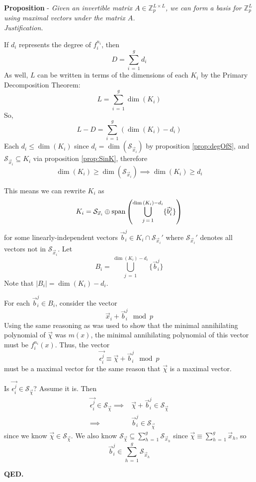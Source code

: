 \documentclass[a4paper, 12pt, reqno]{amsart}
\newcommand\vecspan[1]{\textup{span}\left( #1 \right)}
\newcounter{propcounter}
\newenvironment{proposition}[1]
{
	\refstepcounter{propcounter}
	\textbf{Proposition \thepropcounter} - \emph{#1} \\
	\emph{Justification.}
}
{
	\textbf{QED.} \\
}
\begin{document}
\begin{proposition}{Given an invertible matrix $A \in \mathds{Z}_p^{L \times L}$, we can form a basis for $\mathds{Z}_p^L$ using maximal vectors under the matrix 
		$A$.}
			If $d_i$ represents the degree of $f_i^{n_i}$, then 
			\[
				D = \sum_{i\,=\,1}^g d_i
			\]
			As well, $L$ can be written in terms of the dimensions of each $K_i$ by the Primary Decomposition Theorem:
			\[
				L = \sum_{i\,=\,1}^g \dim{(K_i)}
			\]
			So,
			\[
				L-D = \sum_{i\,=\,1}^g (\dim{(K_i)}-d_i)
			\]
			Each $d_i \leq \dim{(K_i)}$ since $d_i = \dim{(\mathcal{S}_{\vec{x}_i})}$ by proposition \ref{prop:degOfS}, and $\mathcal{S}_{\vec{x}_i} \subseteq K_i$ via 
			proposition \ref{prop:SinK}, therefore
			\[
				\dim{(K_i)} \geq \dim{(\mathcal{S}_{\vec{x}_i})} \implies \dim{(K_i)} \geq d_i
			\]
			
			This means we can rewrite $K_i$ as
			\[
				K_i = \mathcal{S}_{\vec{x}_i} \oplus \vecspan{\bigcup_{j\,=\,1}^{\dim{(K_i)}-d_i} \{\vec{b}_i^j\}}
			\]
			for some linearly-independent vectors $\vec{b}_i^j \in K_i \cap \mathcal{S}_{\vec{x}_i}'$ where $\mathcal{S}_{\vec{x}_i}'$ denotes all vectors not in 
			$\mathcal{S}_{\vec{x}_i}$. Let 
			\[
				B_i = \bigcup_{j\,=\,1}^{\dim{(K_i)}-d_i} \{\vec{b}_i^j\}
			\]
			Note that $|B_i| = \dim{(K_i)}-d_i$.
			
			For each $\vec{b}_i^j \in B_i$, consider the vector
			\[
				\vec{x}_i + \vec{b}_i^j \mod{p}
			\]
			Using the same reasoning as was used to show that the minimal annihilating polynomial of $\vec{\chi}$ was $m(x)$, the minimal annihilating polynomial of this 
			vector must be $f_i^{n_i}(x)$. Thus, the vector
			\[
				\vec{\epsilon_i^j} \equiv \vec{\chi} + \vec{b}_i^j \mod{p}
			\]
			must be a maximal vector for the same reason that $\vec{\chi}$ is a maximal vector.
			
			Is $\vec{\epsilon_i^j} \in \mathcal{S}_{\vec{\chi}}$? Assume it is. Then
			\begin{align*}
				\vec{\epsilon_i^j} \in \mathcal{S}_{\vec{\chi}} \implies& \vec{\chi} + \vec{b}_i^j \in \mathcal{S}_{\vec{\chi}} \\
				                                                \implies& \vec{b}_i^j \in \mathcal{S}_{\vec{\chi}}
			\end{align*}
			since we know $\vec{\chi} \in \mathcal{S}_{\vec{\chi}}$. We also know $\mathcal{S}_{\vec{\chi}} \subseteq \sum_{h\,=\,1}^g \mathcal{S}_{\vec{x}_h}$ since 
			$\vec{\chi} \equiv \sum_{h\,=\,1}^g \vec{x}_h$, so
			\[
				\vec{b}_i^j \in \sum_{h\,=\,1}^g \mathcal{S}_{\vec{x}_h}
			\]


\end{proposition}
\end{document}

